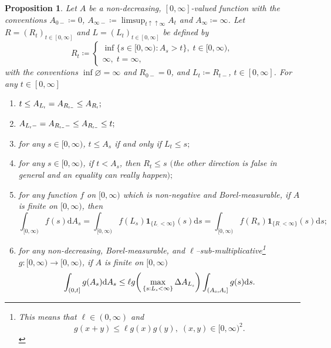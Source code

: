 \documentclass[10pt]{article} %
\newtheorem{proposition}[theorem]{Proposition}
\newcommand{\smalltext}[1]{\text{\fontsize{4}{4}\selectfont$#1$}}
\def\d{\mathrm{d}}
\begin{document}
\begin{proposition}\label{lem::leb_stj}
	Let $A$ be a non-decreasing, $[0,\infty]$-valued function with the conventions $A_{0-} \coloneqq 0$, $A_{\infty-} \coloneqq \limsup_{t \uparrow\uparrow \infty} A_t$ and $A_\infty \coloneqq \infty$.  Let $R = (R_t)_{t\in[0,\infty]}$ and $L = (L_t)_{t\in[0,\infty]}$ be defined by
		\begin{equation*}
			R_t \coloneqq 
			\begin{cases}
				\inf\{ s \in [0,\infty) : A_s > t\}, \; t \in [0,\infty), \\
				\infty, \; t = \infty, 
			\end{cases}
		\end{equation*}
		with the conventions $\inf \varnothing = \infty$ and $R_{0-} = 0$, and $L_t \coloneqq R_{t-}$, $t\in[0,\infty]$. For any $t\in [0,\infty]$
		\begin{enumerate}
			\item[$(i)$] $t \leq A_{L_\smalltext{t}} = A_{R_{\smalltext{t}\smalltext{-}}} \leq A_{R_\smalltext{t}};$
			\item[$(ii)$] $A_{L_\smalltext{t}-} = A_{R_{\smalltext{t}\smalltext{-}}-} \leq A_{R_{\smalltext{t}\smalltext{-}}} \leq t;$
			\item[$(iii)$] for any $s\in[0,\infty)$, $t \leq A_s$ if and only if $L_t \leq s;$
			\item[$(iv)$] for any $s\in[0,\infty)$, if $t < A_s$, then $R_t \leq s$ $($the other direction is false in general and an equality can really happen$);$
			\item [$(v)$] for any function $f$ on $[0,\infty)$ which is non-negative and Borel-measurable, if $A$ is finite on $[0,\infty)$, then
			\begin{equation*}
				\int_{[0,\infty)} f(s) \d A_s = \int_{[0,\infty)} f(L_s) \mathbf{1}_{\{L_\cdot < \infty\}}(s) \d s = \int_{[0,\infty)} f(R_s) \mathbf{1}_{\{R_\cdot < \infty\}}(s) \d s;
			\end{equation*}
			\item[$(vi)$] for any non-decreasing, Borel-measurable, and $\ell$--sub-multiplicative\footnote{This means that $\ell \in (0,\infty)$ and
				\begin{equation*}
					g(x+y) \leq \ell g(x)g(y),\; (x,y) \in [0,\infty)^2.
				\end{equation*}} $g : [0,\infty) \longrightarrow [0,\infty)$, if $A$ is finite on $[0,\infty)$
				\begin{equation*}
					\int_{(0,t]} g(A_s) \d A_s \leq \ell g\bigg( \max_{\{s : L_\smalltext{s} < \infty\}} \Delta A_{L_\smalltext{s}} \bigg) \int_{(A_\smalltext{0}, A_\smalltext{t}]} g(s) \d s.
				\end{equation*}
		\end{enumerate}
\end{proposition}
\end{document}
